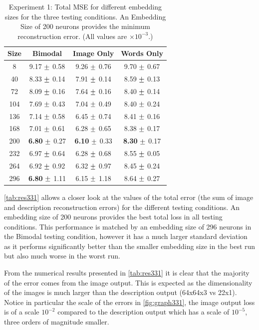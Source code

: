 \begin{table}[h]
\centering
	\begin{tabular}{|c|c|c|c|}
	\hline
	\textbf{Size} & 	\textbf{Bimodal}	 & 	\textbf{Image Only}	& 	\textbf{Words Only} \\ \hline
8	&	9.17	$\mypm$	0.58	&	9.26	$\mypm$	0.76	&	9.70	$\mypm$	0.67	\\ \hline
40	&	8.33	$\mypm$	0.14	&	7.91	$\mypm$	0.14	&	8.59	$\mypm$	0.13	\\ \hline
72	&	8.09	$\mypm$	0.16	&	7.64	$\mypm$	0.16	&	8.40	$\mypm$	0.14	\\ \hline
104	&	7.69	$\mypm$	0.43	&	7.04	$\mypm$	0.49	&	8.40	$\mypm$	0.24	\\ \hline
136	&	7.14	$\mypm$	0.58	&	6.45	$\mypm$	0.74	&	8.41	$\mypm$	0.16	\\ \hline
168	&	7.01	$\mypm$	0.61	&	6.28	$\mypm$	0.65	&	8.38	$\mypm$	0.17	\\ \hline
200	&	\textbf{6.80}	$\mypm$	0.27	&	\textbf{6.10}	$\mypm$	0.33	&	\textbf{8.30}	$\mypm$	0.17	\\ \hline
232	&	6.97	$\mypm$	0.64	&	6.28	$\mypm$	0.68	&	8.55	$\mypm$	0.05	\\ \hline
264	&	6.92	$\mypm$	0.92	&	6.32	$\mypm$	0.97	&	8.45	$\mypm$	0.24	\\ \hline
296	&	\textbf{6.80}	$\mypm$	1.11	&	6.15	$\mypm$	1.18	&	8.64	$\mypm$	0.27	\\ \hline

	\end{tabular}
\caption{Experiment 1: Total MSE for different embedding sizes for the three testing conditions. An Embedding Size of 200 neurons provides the minimum reconstruction error. (All values are $\times10^{-3}$.)}
\label{tab:res331}
\end{table}

\autoref{tab:res331} allows a closer look at the values of the total error (the sum of image and description reconstruction errors) for the different testing conditions. An embedding size of 200 neurons provides the best total loss in all testing conditions. This performance is matched by an embedding size of 296 neurons in the Bimodal testing condition, however it has a much larger standard deviation as it performs significantly better than the smaller embedding size in the best run but also much worse in the worst run.


From the numerical results presented in \autoref{tab:res331} it is clear that the majority of the error comes from the image output. This is expected as the dimensionality of the images is much larger than the description output (64x64x3 vs 22x1). Notice in particular the scale of the errors in \autoref{fig:graph331}, the image output loss is of a scale $10^{-2}$ compared to the description output which has a scale of $10^{-5}$, three orders of magnitude smaller. 

